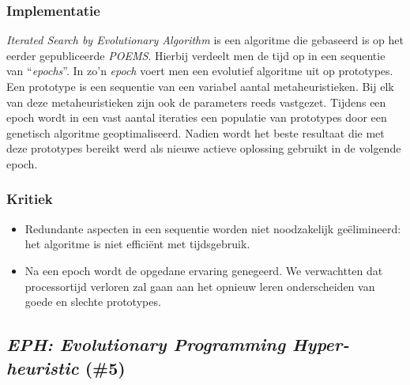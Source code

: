 \subsubsection{Implementatie}
\emph{Iterated Search by Evolutionary Algorithm}\cite{chesc-isea} is een algoritme die gebaseerd is op het eerder gepubliceerde \emph{POEMS}\cite{eurogp06:KubalikFaigl}. Hierbij verdeelt men de tijd op in een sequentie van ``\emph{epochs}''. In zo'n \emph{epoch} voert men een evolutief algoritme uit op prototypes. Een prototype is een sequentie van een variabel aantal metaheuristieken. Bij elk van deze metaheuristieken zijn ook de parameters reeds vastgezet. Tijdens een epoch wordt in een vast aantal iteraties een populatie van prototypes door een genetisch algoritme geoptimaliseerd. Nadien wordt het beste resultaat die met deze prototypes bereikt werd als nieuwe actieve oplossing gebruikt in de volgende epoch. 
\subsubsection{Kritiek}
\begin{itemize}
 \item Redundante aspecten in een sequentie worden niet noodzakelijk ge\"elimineerd: het algoritme is niet effici\"ent met tijdsgebruik.
 \item Na een epoch wordt de opgedane ervaring genegeerd. We verwachtten dat processortijd verloren zal gaan aan het opnieuw leren onderscheiden van goede en slechte prototypes.
\end{itemize}
\subsection{\emph{EPH: Evolutionary Programming Hyper-heuristic} (\#5)}
\label{sss:eph}
